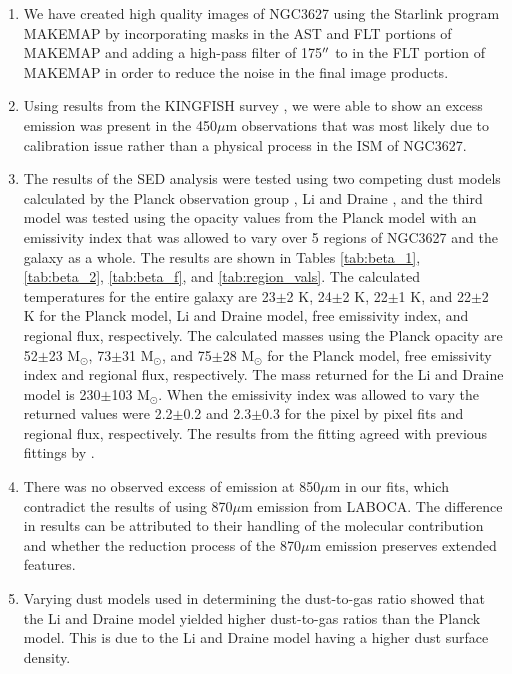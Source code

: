 \begin{enumerate}

\item{We have created high quality images of NGC3627 using the Starlink program MAKEMAP by incorporating masks in the AST and FLT portions of MAKEMAP and adding a high-pass filter of 175$\mbox{$^{\prime\prime}$}$ to in the FLT portion of MAKEMAP in order to reduce the noise in the final image products.}

\item{Using results from the KINGFISH survey \citep{kennicutt2011}, we were able to show an excess emission was present in the 450$\mu$m observations that was most likely due to calibration issue rather than a physical process in the ISM of NGC3627.}

\item{The results of the SED analysis were tested using two competing dust models calculated by the Planck observation group \citep{planckxxv2011}, Li and Draine \citep{li2001}, and the third model was tested using the opacity values from the Planck model with an emissivity index that was allowed to vary over 5 regions of NGC3627 and the galaxy as a whole.  The results are shown in Tables \ref{tab:beta_1}, \ref{tab:beta_2}, \ref{tab:beta_f}, and \ref{tab:region_vals}.  The calculated temperatures for the entire galaxy are 23$\pm$2 K, 24$\pm$2 K, 22$\pm$1 K, and 22$\pm$2 K for the Planck model, Li and Draine model, free emissivity index, and regional flux, respectively.  The calculated masses using the Planck opacity are 52$\pm$23 M$_\odot$, 73$\pm$31 M$_\odot$, and 75$\pm$28 M$_\odot$ for the Planck model, free emissivity index and regional flux, respectively.  The mass returned for the Li and Draine model is 230$\pm$103 M$_\odot$.  When the emissivity index was allowed to vary the returned values were 2.2$\pm$0.2 and 2.3$\pm$0.3 for the pixel by pixel fits and regional flux, respectively.  The results from the fitting agreed with previous fittings by \cite{galametz2012}.}

\item{There was no observed excess of emission at 850$\mu$m in our fits, which contradict the results of \cite{galametz2014} using 870$\mu$m emission from LABOCA.  The difference in results can be attributed to their handling of the molecular contribution and whether the reduction process of the 870$\mu$m emission preserves extended features.}

\item{Varying dust models used in determining the dust-to-gas ratio showed that the Li and Draine model yielded higher dust-to-gas ratios than the Planck model.  This is due to the Li and Draine model having a higher dust surface density.}


\end{enumerate}
